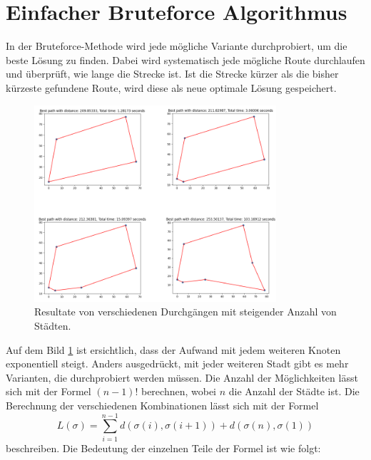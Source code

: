 %
%
%
%
\section{Einfacher Bruteforce Algorithmus
  \label{buch:paper:varalg:section:bruteforce}}
In der Bruteforce-Methode wird jede mögliche Variante durchprobiert,
um die beste Lösung zu finden. Dabei wird systematisch jede mögliche
Route durchlaufen und überprüft, wie lange die Strecke ist.
Ist die Strecke kürzer als die bisher kürzeste gefundene Route,
wird diese als neue optimale Lösung gespeichert.
\begin{figure}
    \centering
    \includegraphics[width=0.8\textwidth]{papers/varalg/images/teil2/02BruteforceMethode.png}
    \caption{Resultate von verschiedenen Durchgängen mit steigender Anzahl von Städten.
        \label{fig:results_bruteforce}}
\end{figure}
Auf dem Bild \ref{fig:results_bruteforce} ist ersichtlich, dass der
Aufwand mit jedem weiteren Knoten exponentiell steigt. Anders
ausgedrückt, mit jeder weiteren Stadt gibt es mehr Varianten, die
durchprobiert werden müssen. Die Anzahl der Möglichkeiten lässt sich
mit der Formel \((n-1)!\) berechnen, wobei \(n\) die Anzahl der Städte ist.
Die Berechnung der verschiedenen Kombinationen lässt sich mit der
Formel
\begin{equation}
    L(\sigma)
    =
    \sum_{i=1}^{n-1} d(\sigma(i), \sigma(i+1)) + d(\sigma(n), \sigma(1))
    \label{eq:bruteforce_min_formula}
\end{equation}
beschreiben. Die Bedeutung der einzelnen Teile der Formel ist wie folgt:
